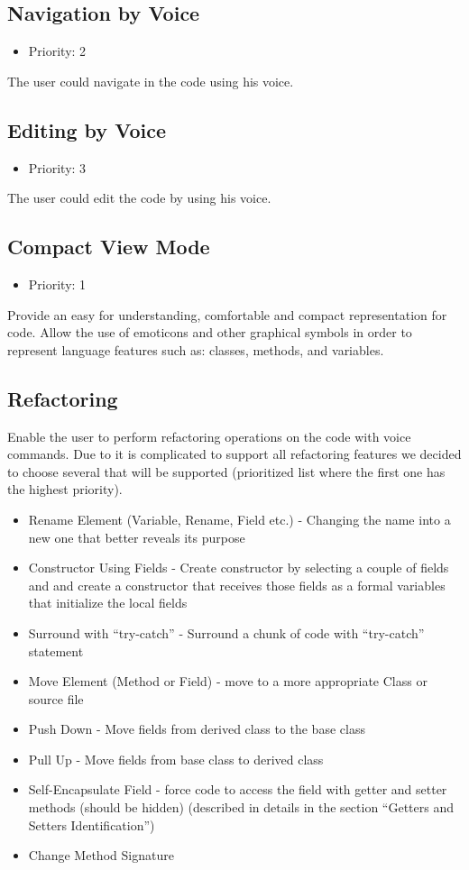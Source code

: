 \subsection{Navigation by Voice}
\begin{itemize}
	\item Priority: 2
\end{itemize}
The user could navigate in the code using his voice.
\subsection{Editing by Voice}
\begin{itemize}
	\item Priority: 3
\end{itemize}
The user could edit the code by using his voice.
\subsection{Compact View Mode}
\begin{itemize}
	\item Priority: 1
\end{itemize}
Provide an easy for understanding, comfortable and compact representation for code. Allow the use of emoticons and other graphical symbols in order to represent language features such as: classes, methods, and variables.
\subsection{Refactoring}
Enable the user to perform refactoring operations on the code with voice commands. Due to it is complicated to support all refactoring features we decided to choose several that will be supported (prioritized list where the first one has the highest priority).
\begin{itemize}
	\item Rename Element (Variable, Rename, Field etc.) - Changing the name into a new one that better reveals its purpose
	\item Constructor Using Fields - Create constructor by selecting a couple of fields and and create a constructor that receives those fields as a formal variables that initialize the local fields
	\item Surround with “try-catch” - Surround a chunk of code with “try-catch” statement
	\item Move Element (Method or Field) - move to a more appropriate Class or source file
	\item Push Down - Move fields from derived class to the base class
	\item Pull Up - Move fields from base class to derived class
	\item Self-Encapsulate Field - force code to access the field with getter and setter methods (should be hidden) (described in details in the section “Getters and Setters Identification”)
	\item Change Method Signature
\end{itemize}